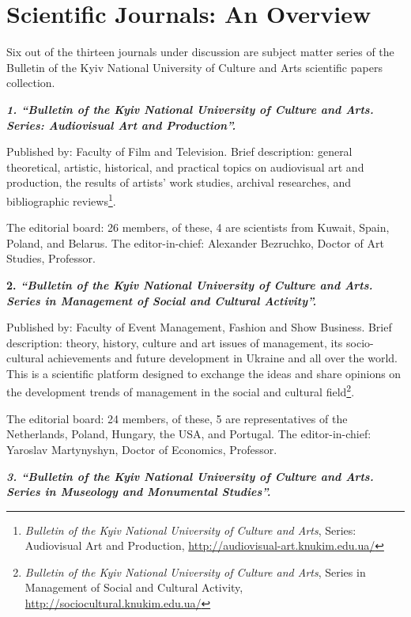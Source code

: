 \documentclass[a4paper,
fontsize=11pt,
oneside,
numbers=noperiodatend,
parskip=half-,
bibliography=totoc,
final
]{scrartcl}
\begin{document}
\hypertarget{scientific-journals-an-overview}{%
\section{Scientific Journals: An
Overview}\label{scientific-journals-an-overview}}

Six out of the thirteen journals under discussion are subject matter
series of the Bulletin of the Kyiv National University of Culture and
Arts scientific papers collection.

\textbf{\emph{1. \enquote{Bulletin of the Kyiv National University of
Culture and Arts. Series: Audiovisual Art and Production}.}}

Published by: Faculty of Film and Television. Brief description: general
theoretical, artistic, historical, and practical topics on audiovisual
art and production, the results of artists' work studies, archival
researches, and bibliographic reviews\footnote{\emph{Bulletin of the
  Kyiv National University of Culture and Arts}, Series: Audiovisual Art
  and Production, \url{http://audiovisual-art.knukim.edu.ua/}}.

The editorial board: 26 members, of these, 4 are scientists from Kuwait,
Spain, Poland, and Belarus. The editor-in-chief: Alexander Bezruchko,
Doctor of Art Studies, Professor.

\textbf{2. \emph{\enquote{Bulletin of the Kyiv National University of
Culture and Arts. Series in Management of Social and Cultural
Activity}.}}

Published by: Faculty of Event Management, Fashion and Show Business.
Brief description: theory, history, culture and art issues of
management, its socio-cultural achievements and future development in
Ukraine and all over the world. This is a scientific platform designed
to exchange the ideas and share opinions on the development trends of
management in the social and cultural field\footnote{\emph{Bulletin of
  the Kyiv National University of Culture and Arts}, Series in
  Management of Social and Cultural Activity,
  \url{http://sociocultural.knukim.edu.ua/}}.

The editorial board: 24 members, of these, 5 are representatives of the
Netherlands, Poland, Hungary, the USA, and Portugal. The
editor-in-chief: Yaroslav Martynyshyn, Doctor of Economics, Professor.

\textbf{\emph{3. \enquote{Bulletin of the Kyiv National University of
Culture and Arts. Series in Museology and Monumental Studies}.}}
\end{document}
